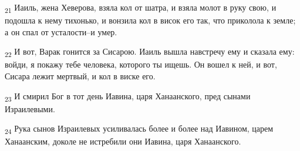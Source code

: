 \begin{tcolorbox}
\textsubscript{21} Иаиль, жена Хеверова, взяла кол от шатра, и взяла молот в руку свою, и подошла к нему тихонько, и вонзила кол в висок его так, что приколола к земле; а он спал от усталости--и умер.
\end{tcolorbox}
\begin{tcolorbox}
\textsubscript{22} И вот, Варак гонится за Сисарою. Иаиль вышла навстречу ему и сказала ему: войди, я покажу тебе человека, которого ты ищешь. Он вошел к ней, и вот, Сисара лежит мертвый, и кол в виске его.
\end{tcolorbox}
\begin{tcolorbox}
\textsubscript{23} И смирил Бог в тот день Иавина, царя Ханаанского, пред сынами Израилевыми.
\end{tcolorbox}
\begin{tcolorbox}
\textsubscript{24} Рука сынов Израилевых усиливалась более и более над Иавином, царем Ханаанским, доколе не истребили они Иавина, царя Ханаанского.
\end{tcolorbox}
